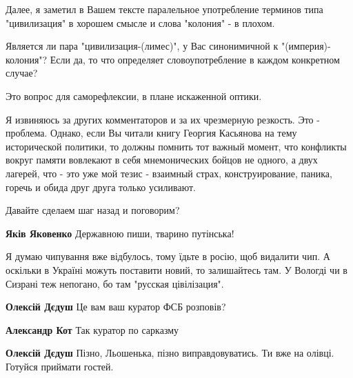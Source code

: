 \begin{itemize}
Далее, я заметил в Вашем тексте паралельное употребление терминов типа
"цивилизация" в хорошем смысле и слова "колония" - в плохом.

Является ли пара "цивилизация-(лимес)", у Вас синонимичной к
"(империя)-колония"? Если да, то что определяет словоупотребление в каждом
конкретном случае?

Это вопрос для саморефлексии, в плане искаженной оптики.

Я извиняюсь за других комментаторов и за их чрезмерную резкость. Это -
проблема. Однако, если Вы читали книгу Георгия Касьянова на тему исторической
политики, то должны помнить тот важный момент, что конфликты вокруг памяти
вовлекают в себя мнемонических бойцов не одного, а двух лагерей, что - это уже
мой тезис - взаимный страх, конструирование, паника, горечь и обида друг друга
только усиливают.

Давайте сделаем шаг назад и поговорим?

\begin{itemize}

\textbf{Яків Яковенко} Державною пиши, тварино путінська!
\end{itemize}



Я думаю чипування вже відбулось, тому їдьте в росію, щоб видалити чип. А
оскільки в Україні можуть поставити новий, то залишайтесь там. У Вологді чи в
Сизрані теж непогано, бо там "русская цівілізация".

\begin{itemize}

\textbf{Олексій Дєдуш} Це вам ваш куратор ФСБ розповів?


\textbf{Александр Кот} Так куратор по сарказму


\textbf{Олексій Дєдуш} Пізно, Льошенька, пізно виправдовуватись. Ти вже на олівці. Готуйся приймати гостей.


\end{itemize}
\end{itemize}
